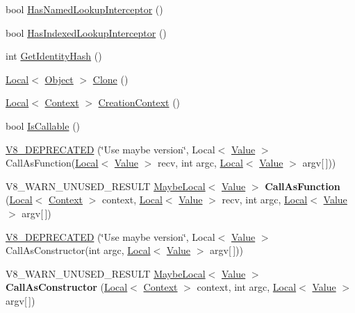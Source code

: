 \begin{DoxyCompactItemize}
\item 
bool \hyperlink{classv8_1_1_object_a1e96fcb9ee17101c0299ec68f2cf8610}{Has\+Named\+Lookup\+Interceptor} ()
\item 
bool \hyperlink{classv8_1_1_object_a278913bcd203434870ce5184a538a9af}{Has\+Indexed\+Lookup\+Interceptor} ()
\item 
int \hyperlink{classv8_1_1_object_ac1ece41e81a499920ec3a2a3471653bc}{Get\+Identity\+Hash} ()
\item 
\hyperlink{classv8_1_1_local}{Local}$<$ \hyperlink{classv8_1_1_object}{Object} $>$ \hyperlink{classv8_1_1_object_a68b17d2eada7c18c1fdb5e2f104c7766}{Clone} ()
\item 
\hyperlink{classv8_1_1_local}{Local}$<$ \hyperlink{classv8_1_1_context}{Context} $>$ \hyperlink{classv8_1_1_object_ac8c025cd67f4820a840789235bdde6cb}{Creation\+Context} ()
\item 
bool \hyperlink{classv8_1_1_object_a23c2c1f23b50fab4a02e2f819641b865}{Is\+Callable} ()
\item 
\hyperlink{classv8_1_1_object_a804b075e3562005ad8d0e2970ce9cf1a}{V8\+\_\+\+D\+E\+P\+R\+E\+C\+A\+T\+ED} (\char`\"{}Use maybe version\char`\"{}, Local$<$ \hyperlink{classv8_1_1_value}{Value} $>$ Call\+As\+Function(\hyperlink{classv8_1_1_local}{Local}$<$ \hyperlink{classv8_1_1_value}{Value} $>$ recv, int argc,                                                                                                                                                                       \hyperlink{classv8_1_1_local}{Local}$<$ \hyperlink{classv8_1_1_value}{Value} $>$ argv\mbox{[}$\,$\mbox{]}))
\item 
V8\+\_\+\+W\+A\+R\+N\+\_\+\+U\+N\+U\+S\+E\+D\+\_\+\+R\+E\+S\+U\+LT \hyperlink{classv8_1_1_maybe_local}{Maybe\+Local}$<$ \hyperlink{classv8_1_1_value}{Value} $>$ {\bfseries Call\+As\+Function} (\hyperlink{classv8_1_1_local}{Local}$<$ \hyperlink{classv8_1_1_context}{Context} $>$ context, \hyperlink{classv8_1_1_local}{Local}$<$ \hyperlink{classv8_1_1_value}{Value} $>$ recv, int argc, \hyperlink{classv8_1_1_local}{Local}$<$ \hyperlink{classv8_1_1_value}{Value} $>$ argv\mbox{[}$\,$\mbox{]})\hypertarget{classv8_1_1_object_a5b801dd756de6194f348275ef1addbfe}{}\label{classv8_1_1_object_a5b801dd756de6194f348275ef1addbfe}

\item 
\hyperlink{classv8_1_1_object_a0ce5417b42d5bfb5a8dc3482dcb733eb}{V8\+\_\+\+D\+E\+P\+R\+E\+C\+A\+T\+ED} (\char`\"{}Use maybe version\char`\"{}, Local$<$ \hyperlink{classv8_1_1_value}{Value} $>$ Call\+As\+Constructor(int argc, \hyperlink{classv8_1_1_local}{Local}$<$ \hyperlink{classv8_1_1_value}{Value} $>$ argv\mbox{[}$\,$\mbox{]}))
\item 
V8\+\_\+\+W\+A\+R\+N\+\_\+\+U\+N\+U\+S\+E\+D\+\_\+\+R\+E\+S\+U\+LT \hyperlink{classv8_1_1_maybe_local}{Maybe\+Local}$<$ \hyperlink{classv8_1_1_value}{Value} $>$ {\bfseries Call\+As\+Constructor} (\hyperlink{classv8_1_1_local}{Local}$<$ \hyperlink{classv8_1_1_context}{Context} $>$ context, int argc, \hyperlink{classv8_1_1_local}{Local}$<$ \hyperlink{classv8_1_1_value}{Value} $>$ argv\mbox{[}$\,$\mbox{]})\hypertarget{classv8_1_1_object_aabdfb3c852676ed0625a59ef0c0ead4a}{}\label{classv8_1_1_object_aabdfb3c852676ed0625a59ef0c0ead4a}


\end{DoxyCompactItemize}

